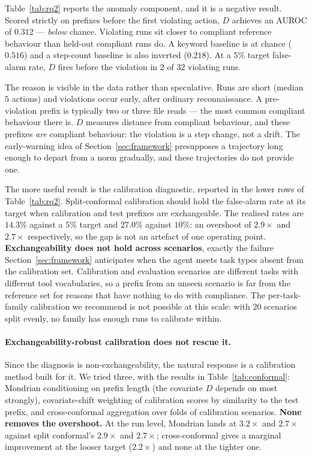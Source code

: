 \documentclass{article}
\begin{document}
Table~\ref{tab:rq2} reports the anomaly component, and it is a negative result. Scored strictly on prefixes before the first violating action, $D$ achieves an AUROC of $0.312$ --- \emph{below} chance. Violating runs sit closer to compliant reference behaviour than held-out compliant runs do. A keyword baseline is at chance ($0.516$) and a step-count baseline is also inverted ($0.218$). At a $5\%$ target false-alarm rate, $D$ fires before the violation in $2$ of $32$ violating runs.

The reason is visible in the data rather than speculative. Runs are short (median $5$ actions) and violations occur early, after ordinary reconnaissance. A pre-violation prefix is typically two or three file reads --- the most common compliant behaviour there is. $D$ measures distance from compliant behaviour, and these prefixes \emph{are} compliant behaviour: the violation is a step change, not a drift. The early-warning idea of Section~\ref{sec:framework} presupposes a trajectory long enough to depart from a norm gradually, and these trajectories do not provide one.

The more useful result is the calibration diagnostic, reported in the lower rows of Table~\ref{tab:rq2}. Split-conformal calibration should hold the false-alarm rate at its target when calibration and test prefixes are exchangeable. The realised rates are $14.3\%$ against a $5\%$ target and $27.0\%$ against $10\%$: an overshoot of $2.9\times$ and $2.7\times$ respectively, so the gap is not an artefact of one operating point. \textbf{Exchangeability does not hold across scenarios}, exactly the failure Section~\ref{sec:framework} anticipates when the agent meets task types absent from the calibration set. Calibration and evaluation scenarios are different tasks with different tool vocabularies, so a prefix from an unseen scenario is far from the reference set for reasons that have nothing to do with compliance. The per-task-family calibration we recommend is not possible at this scale: with 20 scenarios split evenly, no family has enough runs to calibrate within.

\paragraph{Exchangeability-robust calibration does not rescue it.}
Since the diagnosis is non-exchangeability, the natural response is a calibration method built for it. We tried three, with the results in Table~\ref{tab:conformal}: Mondrian conditioning on prefix length (the covariate $D$ depends on most strongly), covariate-shift weighting of calibration scores by similarity to the test prefix, and cross-conformal aggregation over folds of calibration scenarios. \textbf{None removes the overshoot.} At the run level, Mondrian lands at $3.2\times$ and $2.7\times$ against split conformal's $2.9\times$ and $2.7\times$; cross-conformal gives a marginal improvement at the looser target ($2.2\times$) and none at the tighter one.
\end{document}
